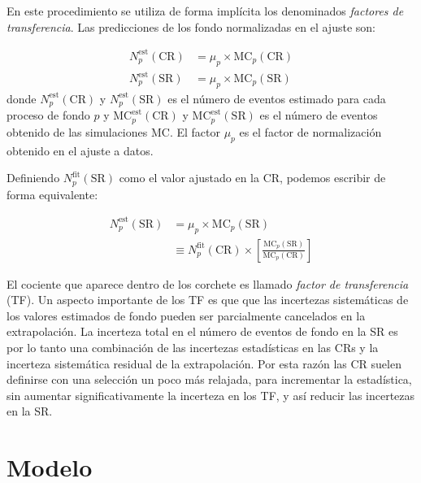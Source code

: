 En este procedimiento se utiliza de forma implícita los
denominados \emph{factores de transferencia}. Las predicciones de los fondo
normalizadas en el ajuste son:

\begin{align}
  N_p^{\text{est}}(\text{CR}) &= \mu_p \times \text{MC}_p (\text{CR})
  \\ N_p^{\text{est}}(\text{SR}) &= \mu_p \times \text{MC}_p (\text{SR})
\end{align}
%
donde $N_p^{\text{est}}(\text{CR})$ y $N_p^{\text{est}}(\text{SR})$ es el número
de eventos estimado para cada proceso de fondo $p$ y
$\text{MC}_p^{\text{est}}(\text{CR})$ y $\text{MC}_p^{\text{est}}(\text{SR})$ es
el número de eventos obtenido de las simulaciones MC. El factor $\mu_p$ es el
factor de normalización obtenido en el ajuste a datos.


Definiendo $N_p^\text{fit}(\text{SR})$ como el valor ajustado en la CR, podemos
escribir de forma equivalente:

\begin{align}
  N_p^\text{est}(\text{SR}) &= \mu_p \times \text{MC}_p (\text{SR}) \nonumber \\
  &\equiv N_p^\text{fit}(\text{CR}) \times \left[ \frac{\text{MC}_p(\text{SR})}{\text{MC}_p(\text{CR})} \right]
\end{align}

El cociente que aparece dentro de los corchete es llamado \emph{factor de
  transferencia} (TF). Un aspecto importante de los TF es que que las incertezas
sistemáticas de los valores estimados de fondo pueden ser parcialmente
cancelados en la extrapolación. La incerteza total en el número de eventos de
fondo en la SR es por lo tanto una combinación de las incertezas estadísticas en
las CRs y la incerteza sistemática residual de la extrapolación. Por esta razón
las CR suelen definirse con una selección un poco más relajada, para incrementar
la estadística, sin aumentar significativamente la incerteza en los TF, y así
reducir las incertezas en la SR.


\section{Modelo}


